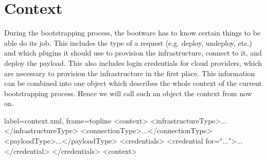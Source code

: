 \section{Context}
\label{context}

During the bootstrapping process, the bootware has to know certain things to be able do its job.
This includes the type of a request (e.g. deploy, undeploy, etc.) and which plugins it should use to provision the infrastructure, connect to it, and deploy the payload.
This also includes login credentials for cloud providers, which are necessary to provision the infrastructure in the first place.
This information can be combined into one object which describes the whole context of the current bootstrapping process.
Hence we will call such an object the context from now on.

\vspace{1em}
\begin{listing}[!htbp]
	\begin{xmlcode*}{label=context.xml,
	                 frame=topline}
<context>
	<infrastructureType>...</infrastructureType>
	<connectionType>...</connectionType>
	<payloadType>...</payloadType>
	<credentials>
		<credential for="...">...</credential>
	</credentials>
<context>
	\end{xmlcode*}
	\caption{Sample context represented in XML.}
	\label{lst:context:sample}
\end{listing}
